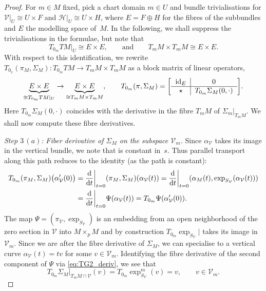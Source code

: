 \documentclass[11pt]{article}
\numberwithin{equation}{section}
\numberwithin{equation}{section}
\newcommand{\cH}{\ensuremath{\mathcal{H}}}
\newcommand{\cV}{\ensuremath{\mathcal{V}}}
\DeclareMathOperator{\id}{id}
\newenvironment{NiceTabular}[1]{\begin{tabular}{#1}}{\end{tabular}}\renewcommand{\qedhere}{}
\begin{document}
\begin{proof}
For $m \in M$ fixed, pick a chart domain $m\in U$ and bundle trivialisations for $\cV|_U\cong U \times F$ and $\cH|_U \cong U \times H$, where $E=F\oplus H$ for the fibres of the subbundles and $E$ the modelling space of~$M$. In the following, we shall suppress the trivialisations in the formulae, but note that
\begin{displaymath}
 T_{0_m}TM|_U \cong E \times E, \qquad \text{and}\qquad T_m M \times T_m M\cong E \times E.
\end{displaymath}
With respect to this identification, we rewrite $T_{0_x} (\pi_M,\Sigma_M) \colon T_{0_m} TM \rightarrow T_m M \times T_{m} M$ as a block matrix of linear operators,
\begin{align}\label{eq:blockoperator}
\underbrace{E \times E}_{\cong T_{0_m}TM|_U} \rightarrow \underbrace{E\times E}_{\cong T_mM\times T_mM}, \qquad T_{0_m} (\pi,\Sigma_M) = \biggl[\begin{NiceTabular}{c|c}
$\id_E$ & $0$ \\ \hline
$\star$ & $T_{0_m} \Sigma_M (0,\cdot)$
\end{NiceTabular}\biggr].
\end{align}
Here $T_{0_m} \Sigma_M (0,\cdot)$ coincides with the derivative in the fibre $T_m M$ of $\Sigma_m|_{T_mM }$. We shall now compute these fibre derivatives.

{\it Step $3\,(a)$:} \emph{Fiber derivative of $\Sigma_M$ on the subspace $\cV_m$.} Since $\alpha_\cV$ takes its image in the vertical bundle, we note that \smash{$\exp_{S_\cH} \bigl(c_{\alpha_\cV(t)}(s)\bigr)= \exp_{S_\cH}\bigl(s0_{\alpha_M (t)}\bigr) =\pi_{\cV}(s\alpha_{\cV}(t))=\alpha_M(t)$} is constant in~$s$. Thus parallel transport along this path reduces to the identity (as the path is constant):
\begin{align*}
T_{0_m} (\pi_M,\Sigma_M)\bigl(\alpha_\cV'(0)\bigr) &= \frac{{\rm d}}{{\rm d}t}\biggr|_{t=0} (\pi_M,\Sigma_M)(\alpha_\cV (t)) = \frac{{\rm d}}{{\rm d}t}\biggr|_{t=0} (\alpha_M (t), \exp_{S_{\cV}} (\alpha_\cV (t))) \\
&= \frac{{\rm d}}{{\rm d}t}\biggr|_{t=0} \Psi (\alpha_{\cV} (t)) =T_{0_m}\Psi (\alpha_{\cV}'(0)).
\end{align*}
The map $\Psi = (\pi_{\cV},\exp_{S_{\cV}})$ is an embedding from an open neighborhood of the zero section in $\cV$ into $M \times_p M$ and by construction $T_{0_m} \exp_{S_{\cV}}|$ takes its image in $\cV_m$. Since we are after the fibre derivative of $\Sigma_M$, we can specialise to a vertical curve $\alpha_{\cV}(t)=tv$ for some $v\in \cV_m$. Identifying the fibre derivative of the second component of $\Psi$ via \eqref{eq:TG2_deriv}, we see that
\[T_{0_m}\Sigma_M|_{T_m M \cap \cV} (v)= T_{0_m}\exp_{S_{\cV}}^m (v)=v,\qquad v \in \cV_m.\]


\end{proof}
\end{document}
